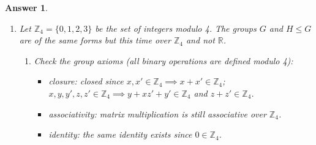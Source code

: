 \documentclass[a4paper]{article}
\newtheorem{ans}{Answer}[section]
\theoremstyle{new}
\begin{document}
\begin{ans}
\begin{enumerate}[label=(\alph*)]
For $H$, trivial to show it inherits associativity and identity ($y=0\in\mathbb{R}$) and has an inverse ($y\in\mathbb{R}\implies -y\in\mathbb{R}$). This satisfies subgroup axioms, so $H\leq G$.\\[5pt]
To check this form a normal subgroup in $G$, we need to show each element in $H$ commutes with every element in $G$ (so each element in $H$ is in their conjugacy classes, hence $H$ is built from the entire conjugacy classes, and hence normal in $G$):
$$ \begin{pmatrix}1&0&y'\\0&1&0\\0&0&1\\\end{pmatrix} \begin{pmatrix}1&x&y\\0&1&z\\0&0&1\\\end{pmatrix}= \begin{pmatrix}1&x&y+y'\\0&1&z\\0&0&1\\\end{pmatrix}=\begin{pmatrix}1&x&y\\0&1&z\\0&0&1\\\end{pmatrix}\begin{pmatrix}1&0&y'\\0&1&0\\0&0&1\\\end{pmatrix}$$
\item Let $\mathbb{Z}_4=\{0,1,2,3\}$ be the set of integers modulo 4. The groups $G$ and $H\leq G$ are of the same forms but this time over $\mathbb{Z}_4$ and not $\mathbb{R}$.
\begin{enumerate}[label=(\roman*)]
\item Check the group axioms (all binary operations are defined modulo 4):
\begin{itemize}
    \item closure: closed since $x,x'\in\mathbb{Z}_4\implies x+x'\in\mathbb{Z}_4$; $x,y,y',z,z'\in\mathbb{Z}_4\implies y+xz'+y'\in\mathbb{Z}_4$ and $z+z'\in\mathbb{Z}_4$.
    \item associativity: matrix multiplication is still associative over $\mathbb{Z}_4$.
    \item identity: the same identity exists since $0\in\mathbb{Z}_4$.

\end{itemize}
\end{enumerate}
\end{enumerate}
\end{ans}
\end{document}
